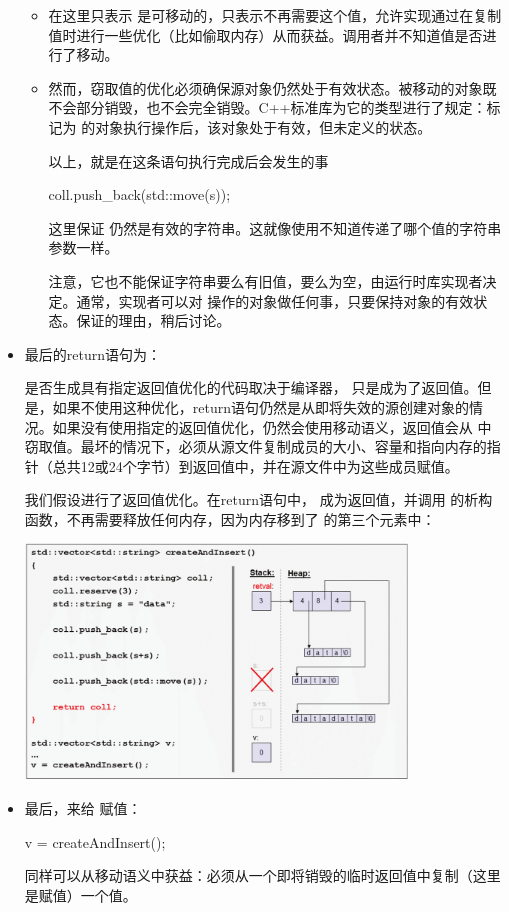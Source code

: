 \begin{itemize}
	\begin{itemize}
		\item {} 在这里只表示  是可移动的，只表示不再需要这个值，允许实现通过在复制值时进行一些优化（比如偷取内存）从而获益。调用者并不知道值是否进行了移动。
		\item 然而，窃取值的优化必须确保源对象仍然处于有效状态。被移动的对象既不会部分销毁，也不会完全销毁。C++标准库为它的类型进行了规定：标记为  的对象执行操作后，该对象处于有效，但未定义的状态。

		以上，就是在这条语句执行完成后会发生的事
\begin{cppcode}
coll.push_back(std::move(s));
\end{cppcode}
		这里保证  仍然是有效的字符串。这就像使用不知道传递了哪个值的字符串参数一样。

		注意，它也不能保证字符串要么有旧值，要么为空，由运行时库实现者决定。通常，实现者可以对  操作的对象做任何事，只要保持对象的有效状态。保证的理由，稍后讨论。
	\end{itemize}

	\item {} 最后的return语句为：

	\begin{cppcode}
	return coll;
}
	\end{cppcode}
	是否生成具有指定返回值优化的代码取决于编译器， 只是成为了返回值。但是，如果不使用这种优化，return语句仍然是从即将失效的源创建对象的情况。如果没有使用指定的返回值优化，仍然会使用移动语义，返回值会从  中窃取值。最坏的情况下，必须从源文件复制成员的大小、容量和指向内存的指针（总共12或24个字节）到返回值中，并在源文件中为这些成员赋值。

	我们假设进行了返回值优化。在return语句中， 成为返回值，并调用  的析构函数，不再需要释放任何内存，因为内存移到了  的第三个元素中：
\begin{center}
		\includegraphics[width=0.8\textwidth]{part1/ch1/images/15}
	\end{center}
	\item 最后，来给  赋值：
\begin{cppcode}
v = createAndInsert();
\end{cppcode}
	同样可以从移动语义中获益：必须从一个即将销毁的临时返回值中复制（这里是赋值）一个值。


\end{itemize}
